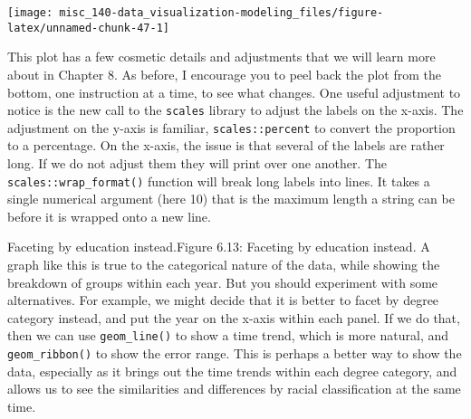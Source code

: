 \documentclass[]{book}
\begin{document}
\begin{center}\texttt{[image: misc\_140-data\_visualization-modeling\_files/figure-latex/unnamed-chunk-47-1]} \end{center}

This plot has a few cosmetic details and adjustments that we will learn more about in Chapter 8. As before, I encourage you to peel back the plot from the bottom, one instruction at a time, to see what changes. One useful adjustment to notice is the new call to the \texttt{scales} library to adjust the labels on the x-axis. The adjustment on the y-axis is familiar, \texttt{scales::percent} to convert the proportion to a percentage. On the x-axis, the issue is that several of the labels are rather long. If we do not adjust them they will print over one another. The \texttt{scales::wrap\_format()} function will break long labels into lines. It takes a single numerical argument (here 10) that is the maximum length a string can be before it is wrapped onto a new line.

Faceting by education instead.Figure 6.13: Faceting by education instead.
A graph like this is true to the categorical nature of the data, while showing the breakdown of groups within each year. But you should experiment with some alternatives. For example, we might decide that it is better to facet by degree category instead, and put the year on the x-axis within each panel. If we do that, then we can use \texttt{geom\_line()} to show a time trend, which is more natural, and \texttt{geom\_ribbon()} to show the error range. This is perhaps a better way to show the data, especially as it brings out the time trends within each degree category, and allows us to see the similarities and differences by racial classification at the same time.\\
\end{document}
